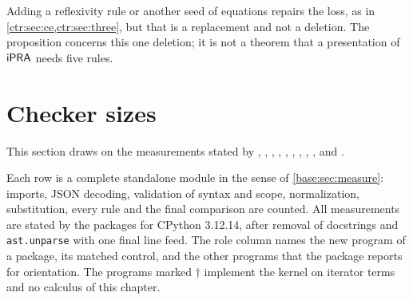 Adding a reflexivity rule or another seed of equations repairs the loss, as in
\cref{ctr:sec:ce,ctr:sec:three}, but that is a replacement and not a deletion. The
proposition concerns this one deletion; it is not a theorem that a presentation of $\mathsf{iPRA}$
needs five rules.

\section{Checker sizes}\label{ctr:sec:sizes}

This section draws on the measurements stated by ,
, , ,
, , ,
, ,  and
.

Each row is a complete standalone module in the sense of \cref{base:sec:measure}: imports,
JSON decoding, validation of syntax and scope, normalization, substitution, every rule and
the final comparison are counted. All measurements are stated by the packages for CPython
3.12.14, after removal of docstrings and \texttt{ast.unparse} with one final line feed. The
role column names the new program of a package, its matched control, and the other programs
that the package reports for orientation. The programs marked $\dagger$ implement the
kernel on iterator terms and no calculus of this chapter.

